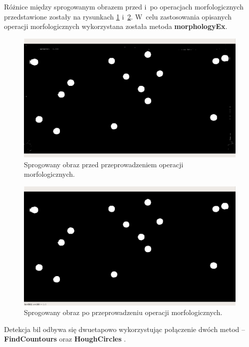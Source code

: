 \documentclass[12pt]{article}
\begin{document}
    Różnice między sprogowanym obrazem przed i~po operacjach morfologicznych przedstawione zostały na rysunkach \ref{thresh_before_morph} i~\ref{thresh_after_morph}. W~celu zastosowania opisanych operacji morfologicznych wykorzystana została metoda \textbf{morphologyEx}\cite{morphologyEx}.

    \begin{figure}[h]
        \centering
        \includegraphics[width=15cm]{./images/obrazki/bp/thresh_before_morph.png}
        \caption{Sprogowany obraz przed przeprowadzeniem operacji morfologicznych.}
        \label{thresh_before_morph}
    \end{figure}

    \begin{figure}[h]
        \centering
        \includegraphics[width=15cm]{./images/obrazki/bp/thresh_contours.png}
        \caption{Sprogowany obraz po przeprowadzeniu operacji morfologicznych.}
        \label{thresh_after_morph}
    \end{figure}
    
    Detekcja bil odbywa się dwuetapowo wykorzystując połączenie dwóch metod – \textbf{FindCountours} \cite{FindContours} oraz \textbf{HoughCircles} \cite{HoughCircles}.
\end{document}
